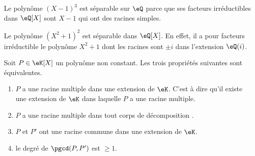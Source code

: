 \begin{example}
    Le polynôme \( (X-1)^3\) est séparable sur \( \eQ\) parce que ses facteurs irréductibles dans \( \eQ[X]\) sont \( X-1\) qui ont des racines simples.
\end{example}

\begin{example}
    Le polynôme \( (X^2+1)^2\) est séparable dans \( \eQ[X]\). En effet, il a pour facteurs irréductible le polynôme \( X^2+1\) dont les racines sont \( \pm i\) dans l'extension \( \eQ(i)\).
\end{example}

\begin{proposition}  \label{PropolyeZff}
    Soit \( P\in \eK[X]\) un polynôme non constant. Les trois propriétés suivantes sont équivalentes.
    \begin{enumerate}
        \item\label{ItemdqPFUi}
            \( P\) a une racine multiple dans une extension de \( \eK\). C'est à dire qu'il existe une extension de \( \eK\) dans laquelle \( P\) a une racine multiple.
        \item\label{ItemdqPFUib}
            \( P\) a une racine multiple dans tout corps de décomposition .
        \item\label{ItemdqPFUii}
            \( P\) et \( P'\) ont une racine commune dans une extension de \( \eK\).
        \item\label{ItemdqPFUiii}
            le degré de \( \pgcd(P,P')\) est \( \geq 1\).
    \end{enumerate}
\end{proposition}

